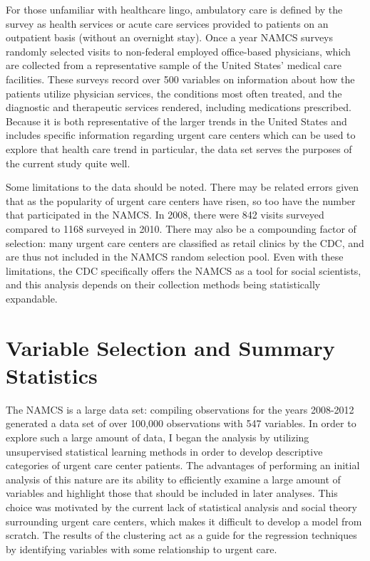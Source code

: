 \documentclass[12pt,twoside]{reedthesis}
\begin{document}
  For those unfamiliar with healthcare lingo, ambulatory care is defined
  by the survey as health services or acute care services provided to
  patients on an outpatient basis (without an overnight stay). Once a year
  NAMCS surveys randomly selected visits to non-federal employed
  office-based physicians, which are collected from a representative
  sample of the United States' medical care facilities. These surveys
  record over 500 variables on information about how the patients utilize
  physician services, the conditions most often treated, and the
  diagnostic and therapeutic services rendered, including medications
  prescribed. Because it is both representative of the larger trends in
  the United States and includes specific information regarding urgent
  care centers which can be used to explore that health care trend in
  particular, the data set serves the purposes of the current study quite
  well.
  
  Some limitations to the data should be noted. There may be related
  errors given that as the popularity of urgent care centers have risen,
  so too have the number that participated in the NAMCS. In 2008, there
  were 842 visits surveyed compared to 1168 surveyed in 2010. There may
  also be a compounding factor of selection: many urgent care centers are
  classified as retail clinics by the CDC, and are thus not included in
  the NAMCS random selection pool. Even with these limitations, the CDC
  specifically offers the NAMCS as a tool for social scientists, and this
  analysis depends on their collection methods being statistically
  expandable.
  
  \section{Variable Selection and Summary
  Statistics}\label{variable-selection-and-summary-statistics}
  
  The NAMCS is a large data set: compiling observations for the years
  2008-2012 generated a data set of over 100,000 observations with 547
  variables. In order to explore such a large amount of data, I began the
  analysis by utilizing unsupervised statistical learning methods in order
  to develop descriptive categories of urgent care center patients. The
  advantages of performing an initial analysis of this nature are its
  ability to efficiently examine a large amount of variables and highlight
  those that should be included in later analyses. This choice was
  motivated by the current lack of statistical analysis and social theory
  surrounding urgent care centers, which makes it difficult to develop a
  model from scratch. The results of the clustering act as a guide for the
  regression techniques by identifying variables with some relationship to
  urgent care.
  
\end{document}
